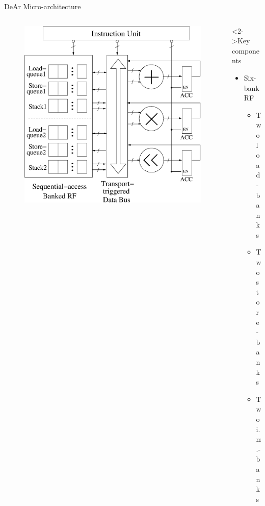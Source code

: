 \documentclass{beamer}
\begin{document}
\begin{CJK}{UTF8}{bkai}
            \begin{frame}{DeAr Micro-architecture}
                \begin{columns}
                    \begin{column}{0.6\textwidth}
                        \begin{figure}[!ht] 
                            \centering
                            \includegraphics[width=1.0\textwidth]{./figs/micro.eps}
                        \end{figure}
                    \end{column}
                    \begin{column}{0.35\textwidth}
                        \begin{block}<2->{Key components}
                            \begin{itemize}
                                \item <3->
                                {
                                    Six-bank RF
                                    \begin{itemize}
                                        \item Two load-banks
                                        \item Two store-banks
                                        \item Two i.m.-banks

\end{itemize}}
\end{itemize}
\end{block}
\end{column}
\end{columns}
\end{frame}
\end{CJK}
\end{document}
